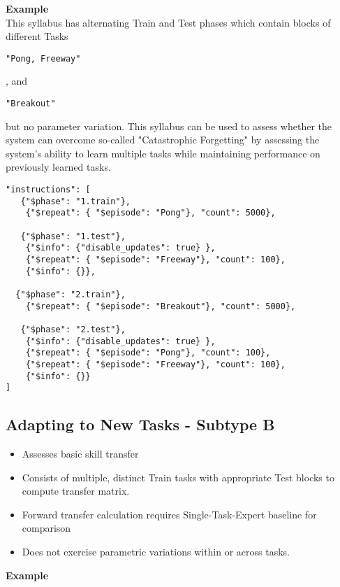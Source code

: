 \textbf{Example}\\[0.1in]

This syllabus has alternating Train and Test phases which contain blocks of different Tasks
\begin{small}
\verb|"Pong, Freeway"|
\end{small}
, and
\begin{small}
\verb|"Breakout"|
\end{small} but no parameter variation. This syllabus can be used to assess whether the system can overcome so-called "Catastrophic Forgetting" by assessing the system's ability to learn multiple tasks while maintaining performance on previously learned tasks.

\begin{small}
\begin{verbatim}
"instructions": [    
   {"$phase": "1.train"}, 
    {"$repeat": { "$episode": "Pong"}, "count": 5000}, 

   {"$phase": "1.test"},   
    {"$info": {"disable_updates": true} }, 
    {"$repeat": { "$episode": "Freeway"}, "count": 100},  
    {"$info": {}},
   
  {"$phase": "2.train"},  
    {"$repeat": { "$episode": "Breakout"}, "count": 5000},

   {"$phase": "2.test"},   
    {"$info": {"disable_updates": true} },
    {"$repeat": { "$episode": "Pong"}, "count": 100},
    {"$repeat": { "$episode": "Freeway"}, "count": 100}, 
    {"$info": {}}
]
\end{verbatim}
\end{small}

\subsection*{Adapting to New Tasks - Subtype B}

\begin{itemize}
\item Assesses basic skill transfer
\item Consists of multiple, distinct Train tasks with appropriate Test blocks to compute transfer matrix.
\item Forward transfer calculation requires Single-Task-Expert baseline for comparison
\item Does not exercise parametric variations within or across tasks.
\end{itemize}

\textbf{Example}\\[0.1in]

